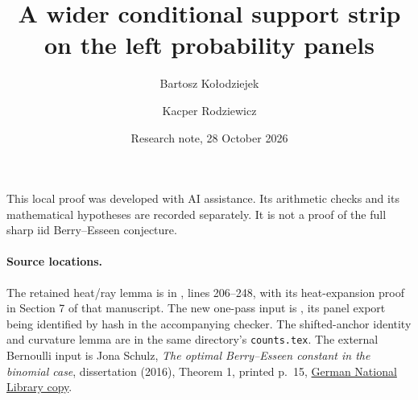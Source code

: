 \documentclass[11pt]{article}
\title{A wider conditional support strip on the left probability panels}
\author{Bartosz Ko{\l}odziejek \and Kacper Rodziewicz}
\date{Research note, 28 October 2026}
\begin{document}
\maketitle
\noindent
This local proof was developed with AI assistance. Its arithmetic checks
and its mathematical hypotheses are recorded separately. It is not a
proof of the full sharp iid Berry--Esseen conjecture.

\paragraph{Source locations.}
The retained heat/ray lemma is in
,
lines 206--248, with its heat-expansion proof in Section 7 of that
manuscript. The new one-pass input is
,
its panel export being identified by hash in the accompanying checker.
The shifted-anchor identity and curvature lemma are in the same directory's
\texttt{counts.tex}. The external Bernoulli input is Jona Schulz,
\emph{The optimal Berry--Esseen constant in the binomial case},
dissertation (2016), Theorem 1, printed p.~15,
\href{https://d-nb.info/1197702695/34}{German National Library copy}.
\end{document}
